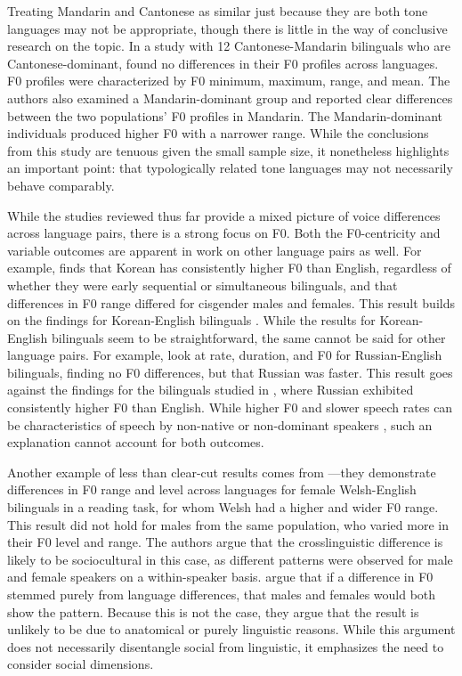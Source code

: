 Treating Mandarin and Cantonese as similar just because they are both tone languages may not be appropriate, though there is little in the way of conclusive research on the topic. In a study with 12 Cantonese-Mandarin bilinguals who are Cantonese-dominant, \citet{yang_2020_f0} found no differences in their F0 profiles across languages. F0 profiles were characterized by F0 minimum, maximum, range, and mean. The authors also examined a Mandarin-dominant group and reported clear differences between the two populations' F0 profiles in Mandarin. The Mandarin-dominant individuals produced higher F0 with a narrower range. While the conclusions from this study are tenuous given the small sample size, it nonetheless highlights an important point: that typologically related tone languages may not necessarily behave comparably.

While the studies reviewed thus far provide a mixed picture of voice differences across language pairs, there is a strong focus on F0. Both the F0-centricity and variable outcomes are apparent in work on other language pairs as well. For example, \citet{cheng_2020_f0} finds that Korean has consistently higher F0 than English, regardless of whether they were early sequential or simultaneous bilinguals, and that differences in F0 range differed for cisgender males and females. This result builds on the findings for Korean-English bilinguals \citep{lee_2017_bilingual}. While the results for Korean-English bilinguals seem to be straightforward, the same cannot be said for other language pairs. For example, \citet{ryabov_2016_self} look at rate, duration, and F0 for Russian-English bilinguals, finding no F0 differences, but that Russian was faster. This result goes against the findings for the bilinguals studied in \citet{altenberg_2006_f0}, where Russian exhibited consistently higher F0 than English. While higher F0 and slower speech rates can be characteristics of speech by non-native or non-dominant speakers \citep{jarvinen_2013_speaking}, such an explanation cannot account for both outcomes.

Another example of less than clear-cut results comes from \citet{ordin_2017_cross}---they demonstrate differences in F0 range and level across languages for female Welsh-English bilinguals in a reading task, for whom Welsh had a higher and wider F0 range. This result did not hold for males from the same population, who varied more in their F0 level and range. The authors argue that the crosslinguistic difference is likely to be sociocultural in this case, as different patterns were observed for male and female speakers on a within-speaker basis. \citet{ordin_2017_cross} argue that if a difference in F0 stemmed purely from language differences, that males and females would both show the pattern. Because this is not the case, they argue that the result is unlikely to be due to anatomical or purely linguistic reasons. While this argument does not necessarily disentangle social from linguistic, it emphasizes the need to consider social dimensions. 

